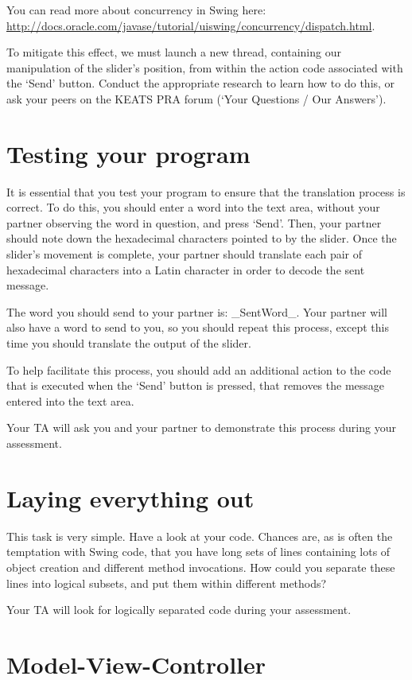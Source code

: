 \documentclass[11pt]{article}
\begin{document}
You can read more about concurrency in Swing here: \url{http://docs.oracle.com/javase/tutorial/uiswing/concurrency/dispatch.html}.

To mitigate this effect, we must launch a new thread, containing our manipulation of the slider's position, from within the action code associated with the `Send' button. Conduct the appropriate research to learn how to do this, or ask your peers on the KEATS PRA forum (`Your Questions / Our Answers').

\section{Testing your program}

It is essential that you test your program to ensure that the translation process is correct. To do this, you should enter a word into the text area, without your partner observing the word in question, and press `Send'. Then, your partner should note down the hexadecimal characters pointed to by the slider. Once the slider's movement is complete, your partner should translate each pair of hexadecimal characters into a Latin character in order to decode the sent message.

The word you should send to your partner is: _SentWord_. Your partner will also have a word to send to you, so you should repeat this process, except this time you should translate the output of the slider.

To help facilitate this process, you should add an additional action to the code that is executed when the `Send' button is pressed, that removes the message entered into the text area.

Your TA will ask you and your partner to demonstrate this process during your assessment.

\section{Laying everything out}

This task is very simple. Have a look at your code. Chances are, as is often the temptation with Swing code, that you have long sets of lines containing lots of object creation and different method invocations. How could you separate these lines into logical subsets, and put them within different methods? 

Your TA will look for logically separated code during your assessment. 

\section{Model-View-Controller}
\end{document}
